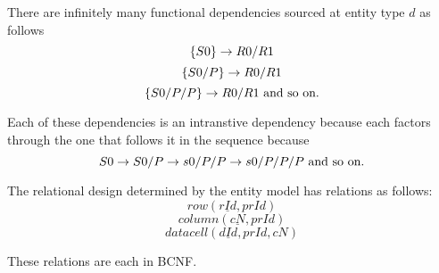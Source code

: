 There are infinitely many functional dependencies sourced at entity type $d$ as follows
\begin{equation*}
\left\{S0\right\} \rightarrow R0/R1
\end{equation*}
\begin{equation*}
\left\{S0/P\right\} \rightarrow R0/R1
\end{equation*}
\begin{equation*}
\left\{S0/P/P\right\} \rightarrow R0/R1 \mbox{ and so on.}
\end{equation*}

Each of these dependencies is an intranstive dependency because each
factors through the one that follows it in the sequence because
\begin{equation}
S0 \rightarrow S0/P \rightarrow s0/P/P \rightarrow s0/P/P/P \mbox{ and so on.}
\end{equation}


The relational design determined by the entity model has relations as follows:
\begin{equation}
\label{rowrelation}
row(\underline{rId}, prId)
\end{equation}
\begin{equation}
\label{columnrelation}
column(\underline{cN}, prId)
\end{equation}
\begin{equation}
\label{rowrelation}
datacell(\underline{dId}, prId, cN)
\end{equation}

These relations are each in BCNF.






